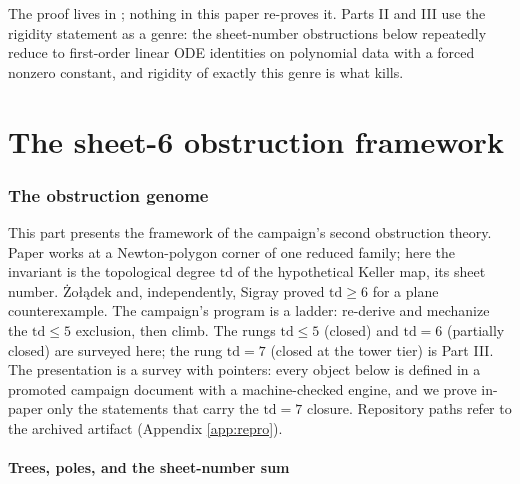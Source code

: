 \documentclass[11pt]{article}
\theoremstyle{definition}
\theoremstyle{remark}
\begin{document}
The proof lives in \cite{P1}; nothing in this paper re-proves it. Parts II and III use the rigidity statement as a genre: the sheet-number obstructions below repeatedly reduce to first-order linear ODE identities on polynomial data with a forced nonzero constant, and rigidity of exactly this genre is what kills.

\part{The sheet-6 obstruction framework}

\section{The obstruction genome}\label{sec:genome}

This part presents the framework of the campaign's second obstruction theory. Paper \cite{P1} works at a Newton-polygon corner of one reduced family; here the invariant is the topological degree $\mathrm{td}$ of the hypothetical Keller map, its sheet number. \.Zo{\l}\k{a}dek \cite{Zoladek} and, independently, Sigray \cite{Sigray} proved $\mathrm{td}\geq 6$ for a plane counterexample. The campaign's program is a ladder: re-derive and mechanize the $\mathrm{td}\leq 5$ exclusion, then climb. The rungs $\mathrm{td}\leq 5$ (closed) and $\mathrm{td}=6$ (partially closed) are surveyed here; the rung $\mathrm{td}=7$ (closed at the tower tier) is Part III. The presentation is a survey with pointers: every object below is defined in a promoted campaign document with a machine-checked engine, and we prove in-paper only the statements that carry the $\mathrm{td}=7$ closure. Repository paths refer to the archived artifact (Appendix \ref{app:repro}).

\subsection{Trees, poles, and the sheet-number sum}\label{sec:trees}
\end{document}
